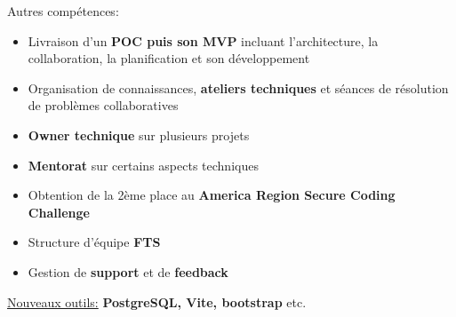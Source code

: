 \documentclass[10pt,a4paper,ragged2e,withhyper]{altacv}
\begin{document}
Autres compétences:
\begin{itemize}
  \item Livraison d'un \textbf{POC puis son MVP} incluant l'architecture, la collaboration, la planification et son développement
  \item Organisation de connaissances, \textbf{ateliers techniques} et séances de résolution de problèmes collaboratives
  \item \textbf{Owner technique} sur plusieurs projets
  \item \textbf{Mentorat} sur certains aspects techniques
  \item Obtention de la 2ème place au \textbf{America Region Secure Coding Challenge}
  \item Structure d'équipe \textbf{FTS}
  \item Gestion de \textbf{support} et de \textbf{feedback}
\end{itemize}
\begin{itshape}
  \underline{Nouveaux outils:}
  \small{\textbf{PostgreSQL, Vite, bootstrap} etc.}
\end{itshape}

\divider
\end{document}
